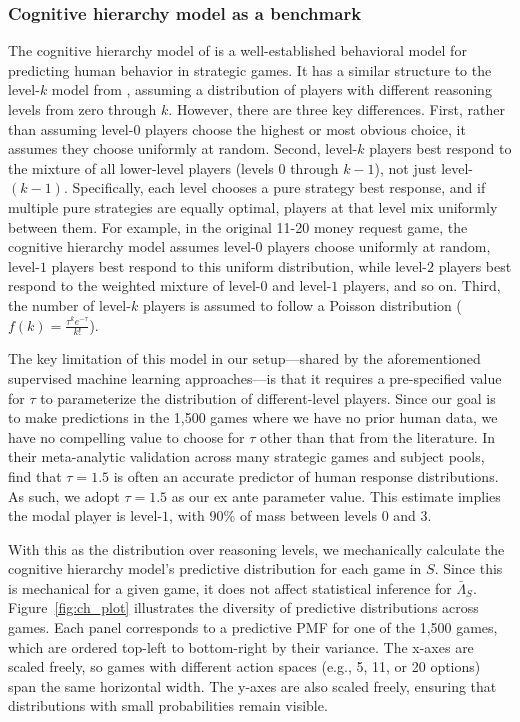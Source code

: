 \subsubsection{Cognitive hierarchy model as a benchmark}

The cognitive hierarchy model of \cite{Camerer2004Cognitive} is a well-established behavioral model for predicting human behavior in strategic games. 
It has a similar structure to the level-$k$ model from \citeauthor{1120Arad2012}, assuming a distribution of players with different reasoning levels from zero through $k$. 
However, there are three key differences. 
First, rather than assuming level-$0$ players choose the highest or most obvious choice, it assumes they choose uniformly at random. 
Second, level-$k$ players best respond to the mixture of all lower-level players (levels $0$ through $k-1$), not just level-$(k-1)$. 
Specifically, each level chooses a pure strategy best response, and if multiple pure strategies are equally optimal, players at that level mix uniformly between them. 
For example, in the original 11-20 money request game, the cognitive hierarchy model assumes level-$0$ players choose uniformly at random, level-$1$ players best respond to this uniform distribution, while level-$2$ players best respond to the weighted mixture of level-$0$ and level-$1$ players, and so on.
Third, the number of level-$k$ players is assumed to follow a Poisson distribution ($f(k) = \frac{\tau^k e^{-\tau}}{k!}$).

The key limitation of this model in our setup---shared by the aforementioned supervised machine learning approaches---is that it requires a pre-specified value for $\tau$ to parameterize the distribution of different-level players.
Since our goal is to make predictions in the 1,500 games where we have no prior human data, we have no compelling value to choose for $\tau$ other than that from the literature.
In their meta-analytic validation across many strategic games and subject pools, \cite{Camerer2004Cognitive} find that $\tau = 1.5$ is often an accurate predictor of human response distributions.
As such, we adopt $\tau = 1.5$ as our ex ante parameter value.
This estimate implies the modal player is level-$1$, with 90\% of mass between levels $0$ and $3$.

With this as the distribution over reasoning levels, we mechanically calculate the cognitive hierarchy model's predictive distribution for each game in $S$.
Since this is mechanical for a given game, it does not affect statistical inference for $\bar\Lambda_{S}$.
Figure~\ref{fig:ch_plot} illustrates the diversity of predictive distributions across games.
Each panel corresponds to a predictive PMF for one of the 1,500 games, which are ordered top-left to bottom-right by their variance.
The x-axes are scaled freely, so games with different action spaces (e.g., 5, 11, or 20 options) span the same horizontal width. 
The y-axes are also scaled freely, ensuring that distributions with small probabilities remain visible.

